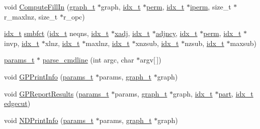 \begin{DoxyCompactItemize}
\item 
void \hyperlink{a00948_a929cf6af13d6bf71bc61657211472eed}{Compute\+Fill\+In} (\hyperlink{a00734}{graph\+\_\+t} $\ast$graph, \hyperlink{a00876_aaa5262be3e700770163401acb0150f52}{idx\+\_\+t} $\ast$\hyperlink{a00879_ab96e9eb84fc7c342d17690a1341645dd}{perm}, \hyperlink{a00876_aaa5262be3e700770163401acb0150f52}{idx\+\_\+t} $\ast$\hyperlink{a00879_a76ba0ee1ced7914ce87ac7eab1758c42}{iperm}, size\+\_\+t $\ast$r\+\_\+maxlnz, size\+\_\+t $\ast$r\+\_\+opc)
\item 
\hyperlink{a00876_aaa5262be3e700770163401acb0150f52}{idx\+\_\+t} \hyperlink{a00948_a4c231449fdf45c79d8d5107ad63b3451}{smbfct} (\hyperlink{a00876_aaa5262be3e700770163401acb0150f52}{idx\+\_\+t} neqns, \hyperlink{a00876_aaa5262be3e700770163401acb0150f52}{idx\+\_\+t} $\ast$\hyperlink{a00879_aa8fc7f75458e38e1e2979ed6db639164}{xadj}, \hyperlink{a00876_aaa5262be3e700770163401acb0150f52}{idx\+\_\+t} $\ast$\hyperlink{a00879_a20c068e3ebdd8f9889fb82c1f677d679}{adjncy}, \hyperlink{a00876_aaa5262be3e700770163401acb0150f52}{idx\+\_\+t} $\ast$\hyperlink{a00879_ab96e9eb84fc7c342d17690a1341645dd}{perm}, \hyperlink{a00876_aaa5262be3e700770163401acb0150f52}{idx\+\_\+t} $\ast$invp, \hyperlink{a00876_aaa5262be3e700770163401acb0150f52}{idx\+\_\+t} $\ast$xlnz, \hyperlink{a00876_aaa5262be3e700770163401acb0150f52}{idx\+\_\+t} $\ast$maxlnz, \hyperlink{a00876_aaa5262be3e700770163401acb0150f52}{idx\+\_\+t} $\ast$xnzsub, \hyperlink{a00876_aaa5262be3e700770163401acb0150f52}{idx\+\_\+t} $\ast$nzsub, \hyperlink{a00876_aaa5262be3e700770163401acb0150f52}{idx\+\_\+t} $\ast$maxsub)
\item 
\hyperlink{a00706}{params\+\_\+t} $\ast$ \hyperlink{a00948_a0e7ce196a2f8882777957bf898739f6f}{parse\+\_\+cmdline} (int argc, char $\ast$argv\mbox{[}$\,$\mbox{]})
\item 
void \hyperlink{a00948_a621f3f8c2f9b93614ecb2fdf86a6cc53}{G\+P\+Print\+Info} (\hyperlink{a00706}{params\+\_\+t} $\ast$params, \hyperlink{a00734}{graph\+\_\+t} $\ast$graph)
\item 
void \hyperlink{a00948_aee005b8826ce55da90165e4a207f8f03}{G\+P\+Report\+Results} (\hyperlink{a00706}{params\+\_\+t} $\ast$params, \hyperlink{a00734}{graph\+\_\+t} $\ast$graph, \hyperlink{a00876_aaa5262be3e700770163401acb0150f52}{idx\+\_\+t} $\ast$\hyperlink{a00879_a0a9ea8670f88d6db1e021fee2dcd94be}{part}, \hyperlink{a00876_aaa5262be3e700770163401acb0150f52}{idx\+\_\+t} \hyperlink{a00879_a8e62a902298dd5fd88ef554d5277b1dc}{edgecut})
\item 
void \hyperlink{a00948_aef57dff33874ea99e9584665424dbf22}{N\+D\+Print\+Info} (\hyperlink{a00706}{params\+\_\+t} $\ast$params, \hyperlink{a00734}{graph\+\_\+t} $\ast$graph)

\end{DoxyCompactItemize}
